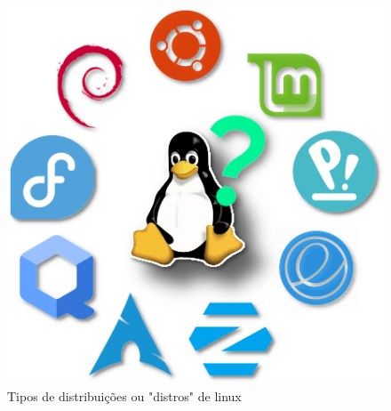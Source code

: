 \par \vspace{13pt}

\begin{figure}[H]
    \centering
    \includegraphics[scale=2.8]{Figures/0. General/linux_distros.png}
    \caption{Tipos de distribuições ou "distros" de linux}
    \label{Distros de linux}
\end{figure}

\newpage
